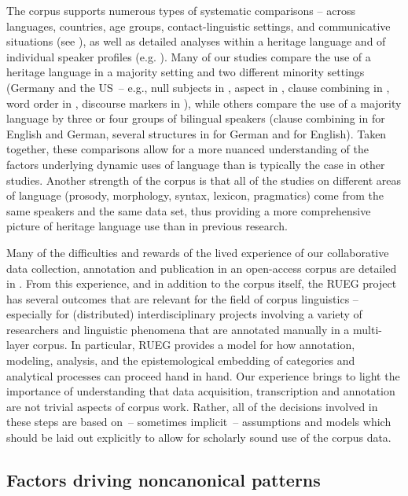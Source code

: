 \documentclass[output=paper,colorlinks,citecolor=brown]{langscibook}
\begin{document}
The corpus supports numerous types of systematic comparisons – across languages, countries, age groups, contact-linguistic settings, and communicative situations (see \cite{chapters/02}), as well as detailed analyses within a heritage language and of individual speaker profiles (e.g. \cite{chapters/05, chapters/10}). Many of our studies compare the use of a heritage language in a majority setting and two different minority settings (Germany and the US~-- e.g., null subjects in \cite{chapters/06}, aspect in \cite{chapters/07}, clause combining in \cite{chapters/08}, word order in \cite{chapters/11}, discourse markers in \cite{chapters/14}), while others compare the use of a majority language by three or four groups of bilingual speakers (clause combining in \cite{chapters/08} for English and German, several structures in \cite{chapters/11} for German and \cite{chapters/11, chapters/13} for English). Taken together, these comparisons allow for a more nuanced understanding of the factors underlying dynamic uses of language than is typically the case in other studies. Another strength of the corpus is that all of the studies on different areas of language (prosody, morphology, syntax, lexicon, pragmatics) come from the same speakers and the same data set, thus providing a more comprehensive picture of heritage language use than in previous research.

Many of the difficulties and rewards of the lived experience of our collaborative data collection, annotation and publication in an open-access corpus are detailed in \textcite{chapters/03}. From this experience, and in addition to the corpus itself, the RUEG project has several outcomes that are relevant for the field of corpus linguistics – especially for (distributed) interdisciplinary projects involving a variety of researchers and linguistic phenomena that are annotated manually in a multi-layer corpus. In particular, RUEG provides a model for how annotation, modeling, analysis, and the epistemological embedding of categories and analytical processes can proceed hand in hand. Our experience brings to light the importance of understanding that data acquisition, transcription and annotation are not trivial aspects of corpus work. Rather, all of the decisions involved in these steps are based on~-- sometimes implicit~-- assumptions and models which should be laid out explicitly to allow for scholarly sound use of the corpus data.

\subsection{Factors driving noncanonical patterns} \label{sec:introwieseetal:noncanonical}
\end{document}
